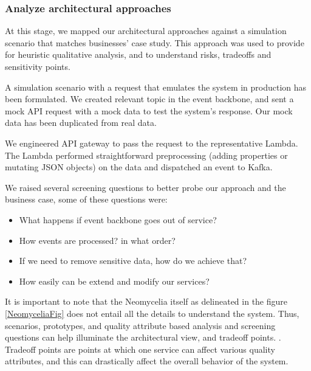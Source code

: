 \documentclass[conference]{IEEEtran}
\begin{document}
\subsubsection{Analyze architectural approaches}

At this stage, we mapped our architectural approaches against a simulation scenario that matches businesses' case study. This approach was used to provide for heuristic qualitative analysis, and to understand risks, tradeoffs and sensitivity points.

A simulation scenario with a request that emulates the system in production has been formulated. We created relevant topic in the event backbone, and sent a mock API request with a mock data to test the system's response. Our mock data has been duplicated from real data.

We engineered API gateway to pass the request to the representative Lambda. The Lambda performed straightforward preprocessing (adding properties or mutating JSON objects) on the data and dispatched an event to Kafka.

We raised several screening questions to better probe our approach and the business case, some of these questions were:

\begin{itemize}
    \item What happens if event backbone goes out of service?
    \item How events are processed? in what order?
    \item If we need to remove sensitive data, how do we achieve that?
    \item How easily can be extend and modify our services?
\end{itemize}

It is important to note that the Neomycelia itself as delineated in the figure \ref{NeomyceliaFig} does not entail all the details to understand the system. Thus, scenarios, prototypes, and quality attribute based analysis and screening questions can help illuminate the architectural view, and tradeoff points. \cite{KazmanATAM}. Tradeoff points are points at which one service can affect various quality attributes, and this can drastically affect the overall behavior of the system.

\end{document}

